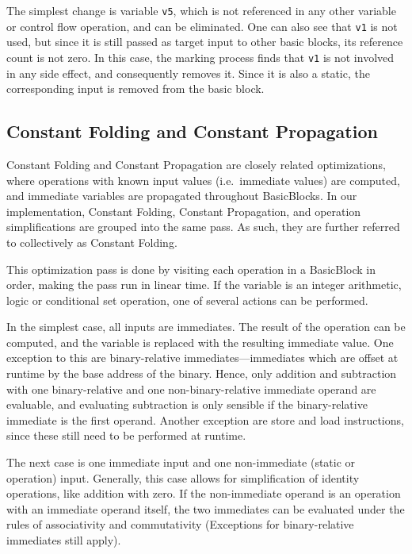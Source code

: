 \documentclass[course=eragp]{aspdoc}
\begin{document}
The simplest change is variable \texttt{v5}, which is not referenced in any other variable or control flow operation,
and can be eliminated. One can also see that \texttt{v1} is not used, but since it is still passed as target input to
other basic blocks, its reference count is not zero. In this case, the marking process finds that \texttt{v1} is not
involved in any side effect, and consequently removes it. Since it is also a static, the corresponding input is removed
from the basic block.

\subsection{Constant Folding and Constant Propagation}\label{constant_folding}

Constant Folding and Constant Propagation are closely related optimizations, where operations with known input values
(i.e.\ immediate values) are computed, and immediate variables are propagated throughout BasicBlocks.
In our implementation, Constant Folding, Constant Propagation, and operation simplifications are grouped into the same
pass.  As such, they are further referred to collectively as Constant Folding.

This optimization pass is done by visiting each operation in a BasicBlock in order, making the pass run in linear time.
If the variable is an integer arithmetic, logic or conditional set operation, one of several actions can be performed.

In the simplest case, all inputs are immediates. The result of the operation can be computed, and the variable is
replaced with the resulting immediate value. One exception to this are binary-relative immediates---immediates which are
offset at runtime by the base address of the binary. Hence, only addition and subtraction with one binary-relative and
one non-binary-relative immediate operand are evaluable, and evaluating subtraction is only sensible if the
binary-relative immediate is the first operand. Another exception are store and load instructions, since these still
need to be performed at runtime.

The next case is one immediate input and one non-immediate (static or operation) input. Generally, this case allows for
simplification of identity operations, like addition with zero. If the non-immediate operand is an operation with an
immediate operand itself, the two immediates can be evaluated under the rules of associativity and commutativity
(Exceptions for binary-relative immediates still apply).
\end{document}
